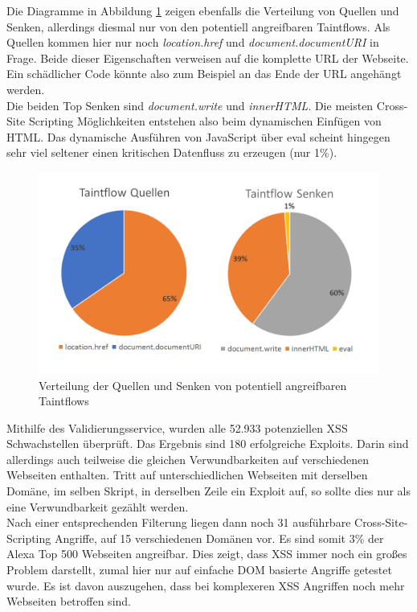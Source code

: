 Die Diagramme in Abbildung \ref{fig:VerteilungQuellenSenkenAngreifbar} zeigen ebenfalls die Verteilung von Quellen und Senken, allerdings diesmal nur von den potentiell angreifbaren Taintflows. Als Quellen kommen hier nur noch \textit{location.href} und \textit{document.documentURI} in Frage. Beide dieser Eigenschaften verweisen auf die komplette URL der Webseite. Ein schädlicher Code könnte also zum Beispiel an das Ende der URL angehängt werden. \\
Die beiden Top Senken sind \textit{document.write} und \textit{innerHTML}. Die meisten Cross-Site Scripting Möglichkeiten entstehen also beim dynamischen Einfügen von HTML. Das dynamische Ausführen von JavaScript über eval scheint hingegen sehr viel seltener einen kritischen Datenfluss zu erzeugen (nur 1\%). 

\begin{figure}[h]
	\centering
	\hspace*{-1.2cm}
	\vspace*{-1.2cm}
	\includegraphics[width=1.2\textwidth]{Bilder/Diagram2.png}
	\caption{Verteilung der Quellen und Senken von potentiell angreifbaren Taintflows}
	\label{fig:VerteilungQuellenSenkenAngreifbar}
\end{figure}

Mithilfe des Validierungsservice, wurden alle 52.933 potenziellen XSS Schwachstellen überprüft. Das Ergebnis sind 180 erfolgreiche Exploits. Darin sind allerdings auch teilweise die gleichen Verwundbarkeiten auf verschiedenen Webseiten enthalten. Tritt auf unterschiedlichen Webseiten mit derselben Domäne, im selben Skript, in derselben Zeile ein Exploit auf, so sollte dies nur als eine Verwundbarkeit gezählt werden. \\
Nach einer entsprechenden Filterung liegen dann noch 31 ausführbare Cross-Site-Scripting Angriffe, auf 15 verschiedenen Domänen vor. Es sind somit 3\% der Alexa Top 500 Webseiten angreifbar. Dies zeigt, dass XSS immer noch ein großes Problem darstellt, zumal hier nur auf einfache DOM basierte Angriffe getestet wurde. Es ist davon auszugehen, dass bei komplexeren XSS Angriffen noch mehr Webseiten betroffen sind.

